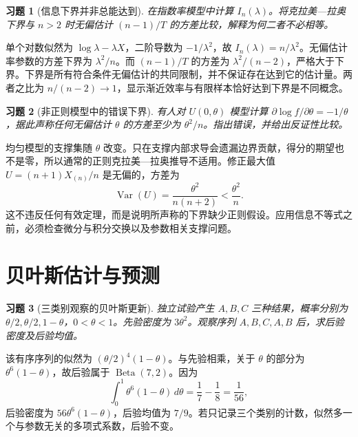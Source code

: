 \documentclass[12pt,fontset=fandol]{ctexart}
\newtheorem{exercise}{习题}[section]
\begin{document}
\begin{exercise}[信息下界并非总能达到]\label{q:B11.7}
在指数率模型中计算 $I_n(\lambda)$。将克拉美—拉奥下界与 $n>2$ 时无偏估计 $(n-1)/T$ 的方差比较，解释为何二者不必相等。\par{}
\end{exercise}

\begin{solve}\label{a:B11.7}单个对数似然为 $\log\lambda-\lambda X$，二阶导数为 $-1/\lambda^2$，故 $I_n(\lambda)=n/\lambda^2$。无偏估计率参数的方差下界为 $\lambda^2/n$。而 $(n-1)/T$ 的方差为 $\lambda^2/(n-2)$，严格大于下界。下界是所有符合条件无偏估计的共同限制，并不保证存在达到它的估计量。两者之比为 $n/(n-2)\to1$，显示渐近效率与有限样本恰好达到下界是不同概念。\end{solve}

\begin{exercise}[非正则模型中的错误下界]\label{q:B11.8}
有人对 $U(0,\theta)$ 模型计算 $\partial\log f/\partial\theta=-1/\theta$，据此声称任何无偏估计 $\theta$ 的方差至少为 $\theta^2/n$。指出错误，并给出反证性比较。\par{}
\end{exercise}

\begin{solve}\label{a:B11.8}均匀模型的支撑集随 $\theta$ 改变。只在支撑内部求导会遗漏边界贡献，得分的期望也不是零，所以通常的正则克拉美—拉奥推导不适用。修正最大值 $U=(n+1)X_{(n)}/n$ 是无偏的，方差为\[\operatorname{Var}(U)=\frac{\theta^2}{n(n+2)}<\frac{\theta^2}{n}.\]这不违反任何有效定理，而是说明所声称的下界缺少正则假设。应用信息不等式之前，必须检查微分与积分交换以及参数相关支撑问题。\end{solve}

\clearpage\section{贝叶斯估计与预测}

\begin{exercise}[三类别观察的贝叶斯更新]\label{q:M-E2-II2}
独立试验产生 $A,B,C$ 三种结果，概率分别为 $\theta/2,\theta/2,1-\theta$，$0<\theta<1$。先验密度为 $3\theta^2$。观察序列 $A,B,C,A,B$ 后，求后验密度及后验均值。\par{}
\end{exercise}

\begin{solve}\label{a:M-E2-II2}该有序序列的似然为 $(\theta/2)^4(1-\theta)$。与先验相乘，关于 $\theta$ 的部分为 $\theta^6(1-\theta)$，故后验属于 $\operatorname{Beta}(7,2)$。因为\[\int_0^1\theta^6(1-\theta)\,d\theta=\frac17-\frac18=\frac1{56},\]后验密度为 $56\theta^6(1-\theta)$，后验均值为 $7/9$。若只记录三个类别的计数，似然多一个与参数无关的多项式系数，后验不变。\end{solve}
\end{document}
